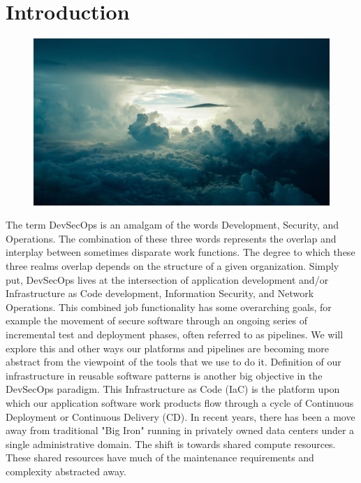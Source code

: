 \chapter{Introduction}
\begin{figure}[htb]
	\includegraphics{../images/sky-690293_1920.jpg}
	\label{fig:sky}
\end{figure}

\justify
The term DevSecOps is an amalgam of the words
Development, Security, and Operations. The combination of
these three words represents the overlap and interplay between
sometimes disparate work functions. The degree to which these three 
realms overlap depends on the structure of a given organization.
Simply put, DevSecOps lives at the intersection of
application development and/or Infrastructure as Code
development, Information Security, and Network Operations.
\justify
This combined job functionality has some overarching goals, for
example the movement of secure
software through an ongoing series of incremental test and deployment
phases, often referred to as pipelines. We will explore this and other
ways our platforms and pipelines
are becoming more abstract from the viewpoint of the tools that we use to do it.
Definition of our infrastructure in reusable software patterns is another big objective
in the DevSecOps paradigm. This Infrastructure as Code (IaC)
is the platform
upon which our application software work products flow through a cycle of Continuous
Deployment or Continuous Delivery (CD).
\justify
In recent years, there has been a move away from traditional
"Big Iron" running in privately owned data centers under a
single administrative domain. The shift is towards shared
compute resources. These shared resources have much of the
maintenance requirements and complexity abstracted away.


